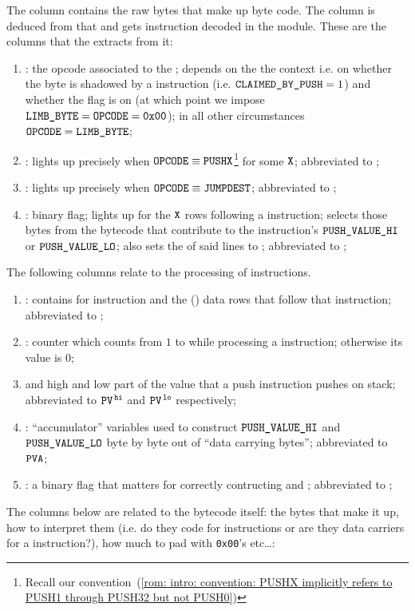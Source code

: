 The \romColumnLimbByte{} column contains the raw bytes that make up byte code.
The \romColumnOpcode{} column is deduced from that and gets instruction decoded in the \idMod{} module.
These are the columns that the \romMod{} extracts from it:
\begin{enumerate}[resume]
    \item \romColumnOpcode{}:
	the opcode associated to the \romColumnLimbByte{};
	depends on the the context i.e. on whether the byte is shadowed by a  instruction (i.e. \( \texttt{CLAIMED\_BY\_PUSH}{} = 1 \)) and whether the \romColumnPadding{} flag is on (at which point we impose $\texttt{LIMB\_BYTE} = \texttt{OPCODE} = \texttt{0x00}$);
	in all other circumstances \( \texttt{OPCODE}{} = \texttt{LIMB\_BYTE}{} \);
    \item \romColumnOpcodeIsPush{}:
	lights up precisely when
	$\texttt{OPCODE} \equiv \texttt{PUSHX}$\footnote{Recall our convention~(\ref{rom: intro: convention: PUSHX implicitly refers to PUSH1 through PUSH32 but not PUSH0})}
	for some $\texttt{X}$;
	abbreviated to \ip{};
    \item \romColumnOpcodeIsJumpDest{}:
	lights up precisely when $\texttt{OPCODE} \equiv \texttt{JUMPDEST}$;
	abbreviated to \isValidJumpDestination{};
    \item \romColumnClaimedByPush{}:
	binary flag;
	lights up for the $\texttt{X}$ rows following a  instruction;
	selects those bytes from the bytecode that contribute to the  instruction's $\texttt{PUSH\_VALUE\_HI}$ or $\texttt{PUSH\_VALUE\_LO}$;
	also sets the \romColumnOpcode{} of said lines to ;
	abbreviated to \romColumnClaimedByPush{};
\end{enumerate}
The following columns relate to the processing of  instructions.
\begin{enumerate}[resume]
    \item \PP{}:
	contains  for  instruction and the () data rows that follow that instruction;
	abbreviated to \pp{};
    \item \CP{}:
	counter which counts from $1$ to \PP{} while processing a  instruction;
	otherwise its value is $0$;
    \item \romColumnPushValueHi{} and \romColumnPushValueLo{}
	high and low part of the value that a push instruction pushes on stack;
	abbreviated to $\texttt{PV}^{\mathtt{\,hi}}$ and $\texttt{PV}^{\mathtt{\,lo}}$ respectively;
    \item \PVA:
	``accumulator'' variables used to construct $\texttt{PUSH\_VALUE\_HI}$ and $\texttt{PUSH\_VALUE\_LO}$ byte by byte out of ``data carrying bytes'';
	abbreviated to $\texttt{PVA}$;
    \item \PFB{}:
	a binary flag that matters for correctly contructing \romColumnPushValueHi{} and \romColumnPushValueLo{};
	abbreviated to \pfb{};
\end{enumerate}
The columns below are related to the bytecode itself: the bytes that make it up, how to interpret them (i.e. do they code for instructions or are they data carriers for a  instruction?), how much to pad with \texttt{0x00}'s etc\dots:

